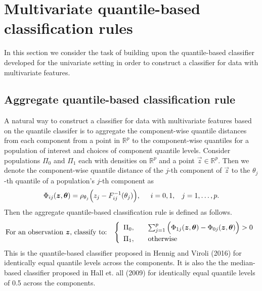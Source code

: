 
\section{Multivariate quantile-based classification rules}
\label{sec:multivariate-classifier}


In this section we consider the task of building upon the quantile-based
classifier developed for the univariate setting in order to construct a
classifier for data with multivariate features.    


\subsection{Aggregate quantile-based classification rule}
\label{sec:aggregate-classifier}

A natural way to construct a classifier for data with multivariate features
based on the quantile classifer is to aggregate the component-wise quantile
distances from each component from a point in $\mathbb{R}^p$ to the
component-wise quantiles for a population of interest and choices of component
quantile levels.  Consider populations $\Pi_0$ and $\Pi_1$ each with densities
on $\mathbb{R}^p$ and a point $\vec{z} \in \mathbb{R}^p$.  Then we denote the
component-wise quantile distance of the $j$-th component of $\vec{z}$ to the
$\theta_j$-th quantile of a population's $j$-th component as
\begin{equation}
  \label{eq:multivariate-phi}
  \Phi_{ij}(\vec{z}, \vec{\theta}) =
  \rho_{\theta_j}\Big(z_j - F_{ij}^{-1}(\theta_j) \Big),
  \hspace{5mm} i = 0, 1, \hspace{3mm} j = 1, \dots, p.
\end{equation}
Then the aggregate quantile-based classification rule is defined as follows.
\begin{equation}
  \label{eq:aggregate-quantile-classifier}
  \text{For an observation $\vec{z}$, classify to:} \hspace{3mm}
  \left\{
    \begin{array}{lll}
      \Pi_0, & & \sum_{j=1}^p \Big( \Phi_{1j}(\vec{z}, \vec{\theta}) -
                 \Phi_{0j}(\vec{z}, \vec{\theta}) \Big) > 0 \\[1ex]
      \Pi_1, & & \text{otherwise}
    \end{array}
  \right.
\end{equation}
This is the quantile-based classifier proposed in Hennig and Viroli (2016) for
identically equal quantile levels across the components.  It is also the the
median-based classifier proposed in Hall et. all (2009) for identically equal
quantile levels of 0.5 across the components.



